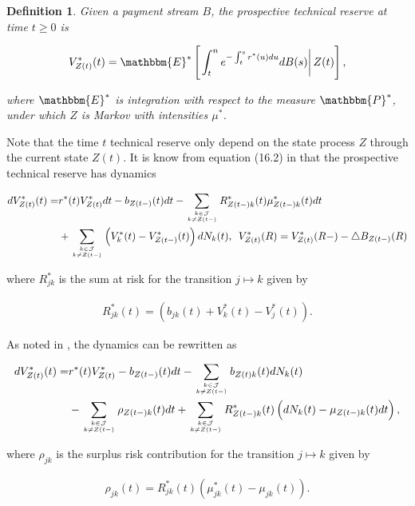 \documentclass{book}
\newcommand{\1}[1]{\mathbbm{1}_{\left\lbrace #1 \right\rbrace}}
\newcommand{\econdStar}[2][def]{\mathbbm{E}^* \left[ \left. #1 \right| #2 \right]}
\theoremstyle{break}
\newtheorem{definition}{Definition}%
\theoremstyle{remark}
\numberwithin{equation}{section}
\begin{document}
\begin{definition}
	Given a payment stream $B$, the prospective technical reserve at time $t \geq 0$ is
	
	\begin{align*}
		V_{Z(t)}^*(t) = \econdStar[\int_t^n e^{-\int_t^s r^*(u)du} dB(s)]{Z(t)},
	\end{align*}
	
	where $\mathbbm{E}^*$ is integration with respect to the measure $\mathbbm{P}^*$, under which $Z$ is Markov with intensities $\mu^*$.
\end{definition}

Note that the time $t$ technical reserve only depend on the state process $Z$ through the current state $Z(t)$. It is know from equation (16.2) in \cite{LivStok} that the prospective technical reserve has dynamics

\begin{align*}
	dV_{Z(t)}^*(t) =& r^*(t) V_{Z(t)}^* dt - b_{Z(t-)}(t) dt - \sum_{k \in \mathcal{J} \atop k \neq Z(t-)} R_{Z(t-)k}^*(t) \mu_{Z(t-)k}^*(t) dt \\
	&+ \sum_{k \in \mathcal{J} \atop k \neq Z(t-)} \left( V_k^*(t) - V_{Z(t-)}^*(t) \right) dN_k(t), \, \, \, V_{Z(t)}^*(R) =  V_{Z(t)}^*(R-) - \triangle B_{Z(t-)}(R)
\end{align*}

where $R_{jk}^*$ is the sum at risk for the transition $j \mapsto k$ given by

\begin{align*}
	R_{jk}^*(t) = \left( b_{jk}(t) + V_{k}^*(t) - V_{j}^*(t) \right).
\end{align*}

As noted in \cite{Lollike}, the dynamics can be rewritten as

\begin{align} \label{ReserveDynamics}
\begin{split}
	dV_{Z(t)}^*(t) =& r^*(t) V_{Z(t)}^* - b_{Z(t-)}(t) dt - \sum_{k \in \mathcal{J} \atop k \neq Z(t-)} b_{Z(t)k}(t) dN_k(t) \\
	&- \sum_{k \in \mathcal{J} \atop k \neq Z(t-)} \rho_{Z(t-)k}(t) dt + \sum_{k \in \mathcal{J} \atop k \neq Z(t-)} R_{Z(t-)k}^*(t) \left( dN_k(t) - \mu_{Z(t-)k}(t) dt \right),
\end{split}
\end{align}

where $\rho_{jk}$ is the surplus risk contribution for the transition $j \mapsto k$ given by

\begin{align*}
	\rho_{jk}(t) = R_{jk}^*(t) \left( \mu_{jk}^*(t) - \mu_{jk}(t) \right).
\end{align*}
\end{document}
